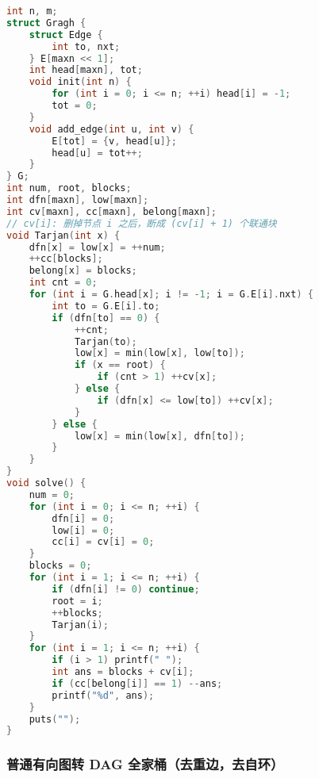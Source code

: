 \begin{lstlisting}[language=C++]
int n, m;
struct Gragh {
    struct Edge {
        int to, nxt;
    } E[maxn << 1];
    int head[maxn], tot;
    void init(int n) {
        for (int i = 0; i <= n; ++i) head[i] = -1;
        tot = 0;
    }
    void add_edge(int u, int v) {
        E[tot] = {v, head[u]};
        head[u] = tot++;
    }
} G;
int num, root, blocks;
int dfn[maxn], low[maxn];
int cv[maxn], cc[maxn], belong[maxn];
// cv[i]: 删掉节点 i 之后，断成 (cv[i] + 1) 个联通块
void Tarjan(int x) {
    dfn[x] = low[x] = ++num;
    ++cc[blocks];
    belong[x] = blocks;
    int cnt = 0;
    for (int i = G.head[x]; i != -1; i = G.E[i].nxt) {
        int to = G.E[i].to;
        if (dfn[to] == 0) {
            ++cnt;
            Tarjan(to);
            low[x] = min(low[x], low[to]);
            if (x == root) {
                if (cnt > 1) ++cv[x];
            } else {
                if (dfn[x] <= low[to]) ++cv[x];
            }
        } else {
            low[x] = min(low[x], dfn[to]);
        }
    }
}
void solve() {
    num = 0;
    for (int i = 0; i <= n; ++i) {
        dfn[i] = 0;
        low[i] = 0;
        cc[i] = cv[i] = 0;
    }
    blocks = 0;
    for (int i = 1; i <= n; ++i) {
        if (dfn[i] != 0) continue;
        root = i;
        ++blocks;
        Tarjan(i);
    }
    for (int i = 1; i <= n; ++i) {
        if (i > 1) printf(" ");
        int ans = blocks + cv[i];
        if (cc[belong[i]] == 1) --ans;
        printf("%d", ans);
    }
    puts("");
}
\end{lstlisting}

\subsubsection{普通有向图转 DAG 全家桶（去重边，去自环）}

